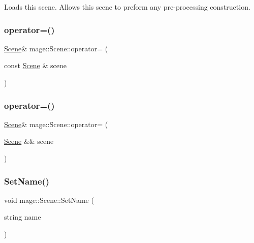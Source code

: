 Loads this scene. Allows this scene to preform any pre-\/processing construction. \hypertarget{classmage_1_1_scene_a2c25c0fedc0230771d8c00a8288a69ce}{}\label{classmage_1_1_scene_a2c25c0fedc0230771d8c00a8288a69ce} 
\subsubsection{\texorpdfstring{operator=()}{operator=()}\hspace{0.1cm}{\footnotesize\ttfamily [1/2]}}
{\footnotesize\ttfamily \hyperlink{classmage_1_1_scene}{Scene}\& mage\+::\+Scene\+::operator= (\begin{DoxyParamCaption}\item[{const \hyperlink{classmage_1_1_scene}{Scene} \&}]{scene }\end{DoxyParamCaption})\hspace{0.3cm}{\ttfamily [delete]}}

\hypertarget{classmage_1_1_scene_a400926762670c9cd9b6d456291600f53}{}\label{classmage_1_1_scene_a400926762670c9cd9b6d456291600f53} 
\subsubsection{\texorpdfstring{operator=()}{operator=()}\hspace{0.1cm}{\footnotesize\ttfamily [2/2]}}
{\footnotesize\ttfamily \hyperlink{classmage_1_1_scene}{Scene}\& mage\+::\+Scene\+::operator= (\begin{DoxyParamCaption}\item[{\hyperlink{classmage_1_1_scene}{Scene} \&\&}]{scene }\end{DoxyParamCaption})\hspace{0.3cm}{\ttfamily [delete]}}

\hypertarget{classmage_1_1_scene_ae5e0a4daa62322ff18d673944ad4e0e8}{}\label{classmage_1_1_scene_ae5e0a4daa62322ff18d673944ad4e0e8} 
\subsubsection{\texorpdfstring{Set\+Name()}{SetName()}}
{\footnotesize\ttfamily void mage\+::\+Scene\+::\+Set\+Name (\begin{DoxyParamCaption}\item[{string}]{name }\end{DoxyParamCaption})\hspace{0.3cm}{\ttfamily [noexcept]}}

